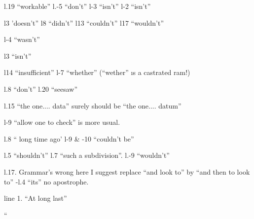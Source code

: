 \hangindent=1.2cm l.19 ``workable'' l.-5 ``don't'' l-3 ``isn't'' l-2 ``isn't''

\hangindent=1.2cm l3 'doesn't'' l8 ``didn't'' l13 ``couldn't'' l17 ``wouldn't''

\hangindent=1.2cm l-4 ``wasn't''

\hangindent=1.2cm l3 ``isn't''

\hangindent=1.2cm l14 ``insufficient'' l-7 ``whether'' (``wether'' \i s a castrated ram!)

\hangindent=1.2cm l.8 ``don't'' l.20 ``seesaw''

\hangindent=1.2cm l.15 ``the one.... data'' surely should be ``the one.... datum''

\hangindent=1.2cm \hspace*{1.2cm}l-9 ``allow one to check'' is more usual.

\hangindent=1.2cm l.8 `` long time ago' l-9 \& -10 ``couldn't be''

\hangindent=1.2cm l.5 ``shouldn't'' l.7 ``such a subdivision''. l.-9 ``wouldn't''

\hangindent=1.2cm l.17. Grammar's wrong here I suggest replace ``and look to'' by ``and then to look to'' -l.4 ``its'' no apostrophe.

\hangindent=1.2cm line 1. ``At long last''

\hangindent=1.2cm  `` 

